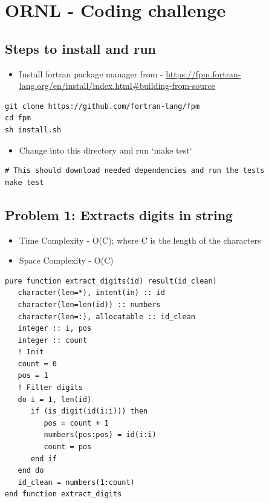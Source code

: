 \documentclass[11pt]{article}
\author{arul}
\date{\today}
\title{}
\begin{document}
\tableofcontents

\section{ORNL - Coding challenge}
\label{sec:org1a1a947}
\subsection{Steps to install and run}
\label{sec:org0c31090}
\begin{itemize}
\item Install fortran package manager from - \url{https://fpm.fortran-lang.org/en/install/index.html\#building-from-source}
\end{itemize}
\begin{verbatim}
git clone https://github.com/fortran-lang/fpm
cd fpm
sh install.sh
\end{verbatim}
\begin{itemize}
\item Change into this directory and run `make test`
\end{itemize}
\begin{verbatim}
# This should download needed dependencies and run the tests
make test
\end{verbatim}
\subsection{Problem 1: Extracts digits in string}
\label{sec:orgeb0ccc3}
\begin{itemize}
\item Time Complexity - O(C); where C is the length of the characters
\item Space Complexity - O(C)
\end{itemize}
\begin{verbatim}
pure function extract_digits(id) result(id_clean)
   character(len=*), intent(in) :: id
   character(len=len(id)) :: numbers
   character(len=:), allocatable :: id_clean
   integer :: i, pos
   integer :: count
   ! Init
   count = 0
   pos = 1
   ! Filter digits
   do i = 1, len(id)
      if (is_digit(id(i:i))) then
         pos = count + 1
         numbers(pos:pos) = id(i:i)
         count = pos
      end if
   end do
   id_clean = numbers(1:count)
end function extract_digits
\end{verbatim}
\end{document}
